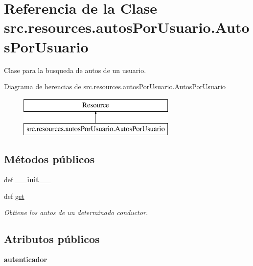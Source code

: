 \hypertarget{classsrc_1_1resources_1_1autos_por_usuario_1_1_autos_por_usuario}{\section{Referencia de la Clase src.\-resources.\-autos\-Por\-Usuario.\-Autos\-Por\-Usuario}
\label{classsrc_1_1resources_1_1autos_por_usuario_1_1_autos_por_usuario}
}


Clase para la busqueda de autos de un usuario.  


Diagrama de herencias de src.\-resources.\-autos\-Por\-Usuario.\-Autos\-Por\-Usuario\begin{figure}[H]
\begin{center}
\leavevmode
\includegraphics[height=2.000000cm]{classsrc_1_1resources_1_1autos_por_usuario_1_1_autos_por_usuario}
\end{center}
\end{figure}
\subsection*{Métodos públicos}
\begin{DoxyCompactItemize}
\item 
\hypertarget{classsrc_1_1resources_1_1autos_por_usuario_1_1_autos_por_usuario_a4ef31d25c8eaa7ec535645d7d62b85c5}{def {\bfseries \-\_\-\-\_\-init\-\_\-\-\_\-}}\label{classsrc_1_1resources_1_1autos_por_usuario_1_1_autos_por_usuario_a4ef31d25c8eaa7ec535645d7d62b85c5}

\item 
def \hyperlink{classsrc_1_1resources_1_1autos_por_usuario_1_1_autos_por_usuario_a2114ca03b2dc41a64af704b59609e791}{get}
\begin{DoxyCompactList}\small\item\em Obtiene los autos de un determinado conductor. \end{DoxyCompactList}\end{DoxyCompactItemize}
\subsection*{Atributos públicos}
\begin{DoxyCompactItemize}
\item 
\hypertarget{classsrc_1_1resources_1_1autos_por_usuario_1_1_autos_por_usuario_aeec994ebf06f73c686dd5560da3add73}{{\bfseries autenticador}}\label{classsrc_1_1resources_1_1autos_por_usuario_1_1_autos_por_usuario_aeec994ebf06f73c686dd5560da3add73}

\end{DoxyCompactItemize}
